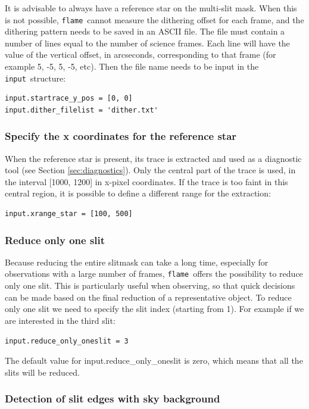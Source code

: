 \documentclass[a4paper, notitlepage]{article}
\newcommand{\flame}{\texttt{flame}}
\newcommand{\inp}{\texttt{input}}
\begin{document}
It is advisable to always have a reference star on the multi-slit mask. When this is not possible, \flame\ cannot measure the dithering offset for each frame, and the dithering pattern needs to be saved in an ASCII file. The file must contain a number of lines equal to the number of science frames. Each line will have the value of the vertical offset, in arcseconds, corresponding to that frame (for example 5, -5, 5, -5, etc). Then the file name needs to be input in the \inp\ structure:
\begin{lstlisting}
input.startrace_y_pos = [0, 0]
input.dither_filelist = 'dither.txt'
\end{lstlisting}


\subsubsection{Specify the x coordinates for the reference star}

When the reference star is present, its trace is extracted and used as a diagnostic tool (see Section \ref{sec:diagnostics}). Only the central part of the trace is used, in the interval [1000, 1200] in x-pixel coordinates. If the trace is too faint in this central region, it is possible to define a different range for the extraction:
\begin{lstlisting}
input.xrange_star = [100, 500]
\end{lstlisting}



\subsubsection{Reduce only one slit}

Because reducing the entire slitmask can take a long time, especially for observations with a large number of frames, \flame\ offers the possibility to reduce only one slit. This is particularly useful when observing, so that quick decisions can be made based on the final reduction of a representative object. To reduce only one slit we need to specify the slit index (starting from 1). For example if we are interested in the third slit:
\begin{lstlisting}
input.reduce_only_oneslit = 3
\end{lstlisting}
The default value for input.reduce\_only\_oneslit is zero, which means that all the slits will be reduced.


\subsubsection{Detection of slit edges with sky background}
\label{sec:use_sky_edge}
\end{document}

